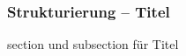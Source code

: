 \begin{frame}
    \frametitle{Strukturierung -- Titel}
    \begin{block}{section und subsection für Titel}
        
    \end{block}
\end{frame}
